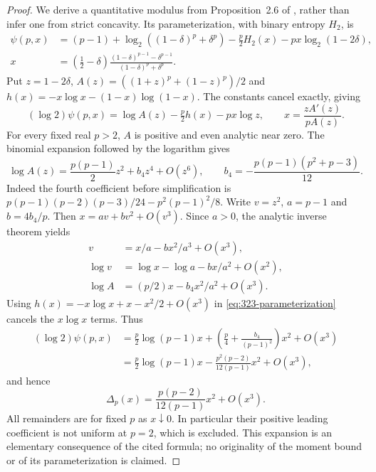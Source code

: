 \documentclass[11pt]{article}
\begin{document}
\begin{proof}
We derive a quantitative modulus from Proposition~2.6 of
\cite{kirshner-samorodnitsky}, rather than infer one from strict concavity.
Its parameterization, with binary entropy $H_2$, is
\begin{align*}
 \psi(p,x)&=(p-1)+\log_2((1-\delta)^p+\delta^p)
       -\tfrac p2 H_2(x)-px\log_2(1-2\delta),\\
 x&=(\tfrac12-\delta)
 \frac{(1-\delta)^{p-1}-\delta^{p-1}}{(1-\delta)^p+\delta^p}.
\end{align*}
Put $z=1-2\delta$, $A(z)=((1+z)^p+(1-z)^p)/2$ and
$h(x)=-x\log x-(1-x)\log(1-x)$. The constants cancel exactly, giving
\begin{equation}\label{eq:323-parameterization}
 (\log2)\psi(p,x)=\log A(z)-\tfrac p2h(x)-px\log z,
 \qquad x=\frac{zA'(z)}{pA(z)}.
\end{equation}
For every fixed real $p>2$, $A$ is positive and even analytic near zero.
The binomial expansion followed by the logarithm gives
\[
 \log A(z)=\frac{p(p-1)}2z^2+b_4z^4+O(z^6),\qquad
 b_4=-\frac{p(p-1)(p^2+p-3)}{12}.
\]
Indeed the fourth coefficient before simplification is
$p(p-1)(p-2)(p-3)/24-p^2(p-1)^2/8$.
Write $v=z^2$, $a=p-1$ and $b=4b_4/p$. Then
$x=av+bv^2+O(v^3)$. Since $a>0$, the analytic inverse theorem yields
\begin{align*}
 v&=x/a-bx^2/a^3+O(x^3),\\
 \log v&=\log x-\log a-bx/a^2+O(x^2),\\
 \log A&=(p/2)x-b_4x^2/a^2+O(x^3).
\end{align*}
Using $h(x)=-x\log x+x-x^2/2+O(x^3)$ in
\eqref{eq:323-parameterization} cancels the $x\log x$ terms. Thus
\begin{align*}
 (\log2)\psi(p,x)
 &=\tfrac p2\log(p-1)x+
       \left(\tfrac p4+\frac{b_4}{(p-1)^2}\right)x^2+O(x^3)\\
 &=\tfrac p2\log(p-1)x-
       \frac{p^2(p-2)}{12(p-1)}x^2+O(x^3),
\end{align*}
and hence
\begin{equation}\label{eq:323-quadratic-deficit}
 \Delta_p(x)=\frac{p(p-2)}{12(p-1)}x^2+O(x^3).
\end{equation}
All remainders are for fixed $p$ as $x\downarrow0$. In particular their
positive leading coefficient is not uniform at $p=2$, which is excluded.
This expansion is an elementary consequence of the cited formula; no
originality of the moment bound or of its parameterization is claimed.


\end{proof}
\end{document}
